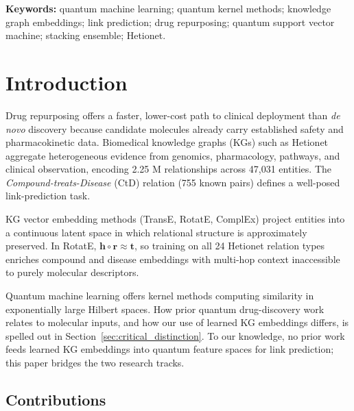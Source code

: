 \medskip\noindent\textbf{Keywords:} quantum machine learning; quantum kernel methods; knowledge graph embeddings;
link prediction; drug repurposing; quantum support vector machine; stacking
ensemble; Hetionet.

\section{Introduction}

Drug repurposing offers a faster, lower-cost path to clinical deployment than
\textit{de novo} discovery because candidate molecules already carry established
safety and pharmacokinetic data.
Biomedical knowledge graphs (KGs) such as Hetionet \cite{himmelstein2017}
aggregate heterogeneous evidence from genomics, pharmacology, pathways, and
clinical observation, encoding 2.25 M relationships across 47,031 entities.
The \textit{Compound-treats-Disease} (CtD) relation (755 known pairs) defines
a well-posed link-prediction task.

KG vector embedding methods (TransE, RotatE, ComplEx) project entities into a
continuous latent space in which relational structure is approximately preserved.
In RotatE, $\mathbf{h}\circ\mathbf{r}\approx\mathbf{t}$, so training on all
24 Hetionet relation types enriches compound and disease embeddings with
multi-hop context inaccessible to purely molecular descriptors.

Quantum machine learning offers kernel methods computing similarity in
exponentially large Hilbert spaces.
How prior quantum drug-discovery work relates to molecular inputs, and how our
use of learned KG embeddings differs, is spelled out in
Section~\ref{sec:critical_distinction}.
To our knowledge, no prior work feeds learned KG embeddings into quantum feature
spaces for link prediction; this paper bridges the two research tracks.

\subsection{Contributions}

